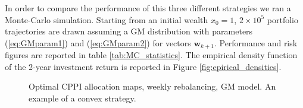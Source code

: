 In order to compare the performance of this three different strategies we ran a Monte-Carlo simulation. Starting from an initial wealth $x_0=1$, $2\times 10^5$ portfolio trajectories are drawn assuming a GM distribution with parameters (\ref{eq:GMparam1}) and (\ref{eq:GMparam2}) for vectors $\bm{w}_{k+1}$. Performance and risk figures are reported in table \ref{tab:MC_statistics}. The empirical density function of the 2-year investment return is reported in Figure \ref{fig:epirical_densities}.








\begin{figure}[]
	\caption{Optimal CPPI allocation maps, weekly rebalancing, GM model. An example of a convex strategy.}
	\label{fig:mapsMixtureCPPI}
\end{figure}


